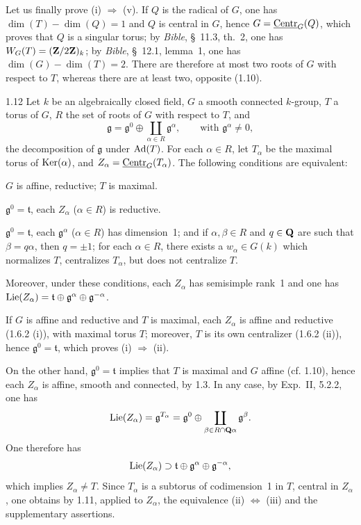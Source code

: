 Let us finally prove (i) $\Rightarrow$ (v). If $Q$ is the radical of $G$, one has $\dim(T)-\dim(Q)=1$ and $Q$ is central in $G$, hence $G=\underline{\mathrm{Centr}}_G(Q)$, which proves that $Q$ is a singular torus; by \textit{Bible}, \S~11.3, th.~2, one has $W_G(T)=(\mathbf{Z}/2\mathbf{Z})_k$; by \textit{Bible}, \S~12.1, lemma~1, one has $\dim(G)-\dim(T)=2$. There are therefore at most two roots of $G$ with respect to $T$, whereas there are at least two, opposite (1.10).

\begin{proposition}{1.12}\label{XIX.1.12}
Let $k$ be an algebraically closed field, $G$ a smooth connected $k$-group, $T$ a torus of $G$, $R$ the set of roots of $G$ with respect to $T$, and
\[
\mathfrak g=\mathfrak g^0\oplus\coprod_{\alpha\in R}\mathfrak g^\alpha,
\qquad\text{with }\mathfrak g^\alpha\ne0,
\]
the decomposition of $\mathfrak g$ under $\operatorname{Ad}(T)$. For each $\alpha\in R$, let $T_\alpha$ be the maximal torus of $\operatorname{Ker}(\alpha)$,{\renewcommand{\thefootnote}{(12)}} and $Z_\alpha=\underline{\mathrm{Centr}}_G(T_\alpha)$. The following conditions are equivalent:
\begin{enumeratei}
\item $G$ is affine, reductive; $T$ is maximal.
\item $\mathfrak g^0=\mathfrak t$, each $Z_\alpha$ ($\alpha\in R$) is reductive.
\item $\mathfrak g^0=\mathfrak t$, each $\mathfrak g^\alpha$ ($\alpha\in R$) has dimension~1; and if $\alpha,\beta\in R$ and $q\in\mathbf{Q}$ are such that $\beta=q\alpha$, then $q=\pm1$; for each $\alpha\in R$, there exists a $w_\alpha\in G(k)$ which normalizes $T$, centralizes $T_\alpha$, but does not centralize $T$.
\end{enumeratei}
Moreover, under these conditions, each $Z_\alpha$ has semisimple rank~1 and one has $\operatorname{Lie}(Z_\alpha)=\mathfrak t\oplus\mathfrak g^\alpha\oplus\mathfrak g^{-\alpha}$.
\end{proposition}
If $G$ is affine and reductive and $T$ is maximal, each $Z_\alpha$ is affine and reductive (1.6.2 (i)), with maximal torus $T$; moreover, $T$ is its own centralizer (1.6.2 (ii)), hence $\mathfrak g^0=\mathfrak t$, which proves (i) $\Rightarrow$ (ii).

On the other hand, $\mathfrak g^0=\mathfrak t$ implies that $T$ is maximal and $G$ affine (cf. 1.10), hence each $Z_\alpha$ is affine, smooth and connected, by 1.3. In any case, by Exp.~II, 5.2.2, one has
\[
\operatorname{Lie}(Z_\alpha)=\mathfrak g^{T_\alpha}=\mathfrak g^0\oplus\coprod_{\beta\in R\cap\mathbf{Q}\alpha}\mathfrak g^\beta.
\]
One therefore has
\[
\operatorname{Lie}(Z_\alpha)\supset\mathfrak t\oplus\mathfrak g^\alpha\oplus\mathfrak g^{-\alpha},
\]
which implies $Z_\alpha\ne T$. Since $T_\alpha$ is a subtorus of codimension~1 in $T$, central in $Z_\alpha$, one obtains by 1.11, applied to $Z_\alpha$, the equivalence (ii) $\Leftrightarrow$ (iii) and the supplementary assertions.

